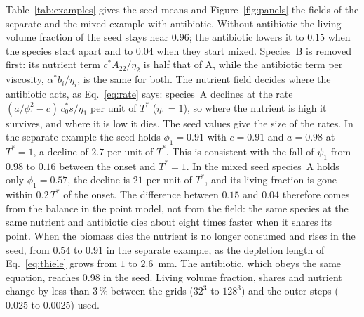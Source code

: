 \documentclass[11pt,a4paper]{article}
\begin{document}
Table~\ref{tab:examples} gives the seed means and Figure~\ref{fig:panels} the fields of the separate and the mixed example with antibiotic. Without antibiotic the living volume fraction of the seed stays near $0.96$; the antibiotic lowers it to $0.15$ when the species start apart and to $0.04$ when they start mixed. Species~B is removed first: its nutrient term $c^*A_{22}/\eta_2$ is half that of A, while the antibiotic term per viscosity, $\alpha^*b_i/\eta_i$, is the same for both. The nutrient field decides where the antibiotic acts, as Eq.~\eqref{eq:rate} says: species~A declines at the rate $(a/\phi_1^2-c)\,c^*_0s/\eta_1$ per unit of $T^*$ ($\eta_1=1$), so where the nutrient is high it survives, and where it is low it dies. The seed values give the size of the rates. In the separate example the seed holds $\phi_1=0.91$ with $c=0.91$ and $a=0.98$ at $T^*=1$, a decline of $2.7$ per unit of $T^*$. This is consistent with the fall of $\psi_1$ from $0.98$ to $0.16$ between the onset and $T^*=1$. In the mixed seed species~A holds only $\phi_1=0.57$, the decline is $21$ per unit of $T^*$, and its living fraction is gone within $0.2\,T^*$ of the onset. The difference between $0.15$ and $0.04$ therefore comes from the balance in the point model, not from the field: the same species at the same nutrient and antibiotic dies about eight times faster when it shares its point. When the biomass dies the nutrient is no longer consumed and rises in the seed, from $0.54$ to $0.91$ in the separate example, as the depletion length of Eq.~\eqref{eq:thiele} grows from $1$ to $2.6$~mm. The antibiotic, which obeys the same equation, reaches $0.98$ in the seed. Living volume fraction, shares and nutrient change by less than $3\,\%$ between the grids ($32^3$ to $128^3$) and the outer steps ($0.025$ to $0.0025$) used.
\end{document}
